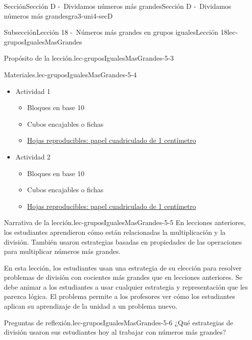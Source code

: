 \documentclass[oneside,10pt,]{article}
\begin{document}
\begin{sectionptx}{Sección}{Sección D -~Dividamos números más grandes}{}{Sección D -~Dividamos números más grandes}{}{}{gra3-uni4-secD}
\begin{subsectionptx}{Subsección}{Lección 18 -~Números más grandes en grupos iguales}{}{Lección 18}{}{}{lec-gruposIgualesMasGrandes}
\begin{introduction}{}
\begin{paragraphs}{Propósito de la lección.}{lec-gruposIgualesMasGrandes-5-3}
\end{paragraphs}%
\begin{paragraphs}{Materiales.}{lec-gruposIgualesMasGrandes-5-4}%
%
\begin{itemize}[label=\textbullet]
\item{}Actividad 1%
%
\begin{itemize}[label=$\circ$]
\item{}Bloques en base 10%
\item{}Cubos encajables o fichas%
\item{}\hyperref[blm-papelCuadriculadoCentimetro]{Hojas reproducibles: papel cuadriculado de 1 centímetro}%
\end{itemize}
\item{}Actividad 2%
%
\begin{itemize}[label=$\circ$]
\item{}Bloques en base 10%
\item{}Cubos encajables o fichas%
\item{}\hyperref[blm-papelCuadriculadoCentimetro]{Hojas reproducibles: papel cuadriculado de 1 centímetro}%
\end{itemize}
\end{itemize}
\end{paragraphs}%
\begin{paragraphs}{Narrativa de la lección.}{lec-gruposIgualesMasGrandes-5-5}%
En lecciones anteriores, los estudiantes aprendieron cómo están relacionadas la multiplicación y la división. También usaron estrategias basadas en propiedades de las operaciones para multiplicar números más grandes.%
\par
En esta lección, los estudiantes usan una estrategia de su elección para resolver problemas de división con cocientes más grandes que en lecciones anteriores. Se debe animar a los estudiantes a usar cualquier estrategia y representación que les parezca lógica. El problema permite a los profesores ver cómo los estudiantes aplican su aprendizaje de la unidad a un problema nuevo.%
\end{paragraphs}%
\begin{paragraphs}{Preguntas de reflexión.}{lec-gruposIgualesMasGrandes-5-6}%
¿Qué estrategias de división usaron sus estudiantes hoy al trabajar con números más grandes?%
\end{paragraphs}%
\end{introduction}%
%
%
\typeout{************************************************}
\typeout{************************************************}

\end{subsectionptx}
\end{sectionptx}
\end{document}
